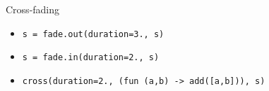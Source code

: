 \documentclass{beamer}
\begin{document}
\begin{frame}{Cross-fading}

\begin{itemize}
\item \lstinline{s = fade.out(duration=3., s)}
\item<2-> \lstinline{s = fade.in(duration=2., s)}
\item<3> \lstinline{cross(duration=2., (fun (a,b) -> add([a,b])), s)}
\end{itemize}

\end{frame}
\end{document}
